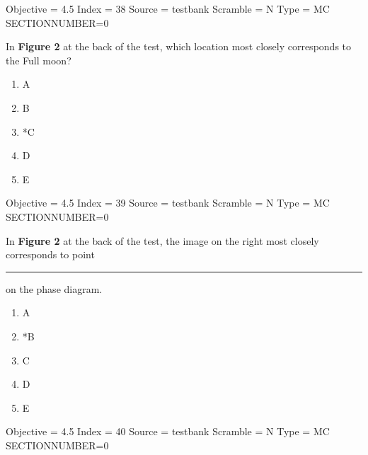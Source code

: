 \documentclass[11pt]{article}
\begin{document}
\begin{enumerate}
\begin{minipage}{\textwidth}
\begin{minipage}{\textwidth}
Objective = 4.5
Index = 38
Source = testbank
Scramble = N
Type = MC
SECTIONNUMBER=0
\end{minipage}
\end{minipage}
\vskip 0.20in

\begin{minipage}{\textwidth}
\begin{minipage}{\textwidth}
\item In {\bf Figure 2} at the back of the test, which location most closely corresponds to the Full moon?
\begin{multicols}{3}
\begin{enumerate} 
\setlength{\itemsep}{1pt} 
\setlength{\parskip}{0pt} 
\setlength{\parsep}{0pt}
\setlength{\multicolsep}{1pt} 
\item A
\item B
\item *C
\item D
\item E
\end{enumerate} 
\vfill 
\end{multicols}

Objective = 4.5
Index = 39
Source = testbank
Scramble = N
Type = MC
SECTIONNUMBER=0
\end{minipage}
\end{minipage}
\vskip 0.20in

\begin{minipage}{\textwidth}
\begin{minipage}{\textwidth}
\item In {\bf Figure 2} at the back of the test, the image on the right most closely corresponds to point \rule{10mm}{0.4pt} on the phase diagram.
\begin{multicols}{3}
\begin{enumerate} 
\setlength{\itemsep}{1pt} 
\setlength{\parskip}{0pt} 
\setlength{\parsep}{0pt}
\setlength{\multicolsep}{1pt} 
\item A
\item *B
\item C
\item D
\item E
\end{enumerate} 
\vfill 
\end{multicols}

Objective = 4.5
Index = 40
Source = testbank
Scramble = N
Type = MC
SECTIONNUMBER=0
\end{minipage}
\end{minipage}
\vskip 0.20in


\end{enumerate}
\end{document}
